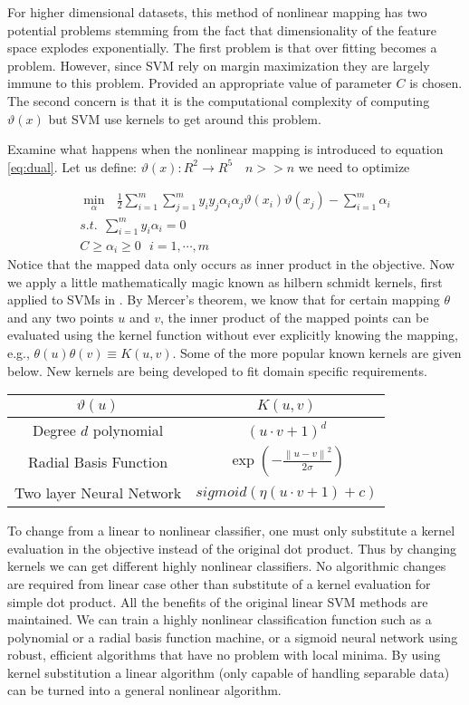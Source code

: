 For higher dimensional datasets, this method of nonlinear mapping has two potential problems stemming from the fact that dimensionality of the feature space explodes exponentially. The first problem is that over fitting becomes a problem. However, since SVM rely on margin maximization they are largely immune to this problem. Provided an appropriate value of parameter $C$ is chosen. The second concern is that it is the computational complexity of   computing $\vartheta(x)$ but SVM use kernels to get around this problem.  

Examine what happens when  the nonlinear mapping is introduced to equation \ref{eq:dual}. Let us define: $\vartheta(x):R^2\rightarrow R^5 \quad n>> n$  we need to optimize

\begin{equation}
\begin{array}{c}
\min_{\alpha} \ \ \   \frac{1}{2} \sum_{i=1}^{m}{\sum_{j=1}^{m}{y_iy_j\alpha_i\alpha_j\vartheta(x_i)\vartheta(x_j)}} - \sum_{i=1}^{m}{\alpha_i} \\
s.t. \ \ \sum_{i=1}^{m}{y_i\alpha_i}=0   \\
 C \geq \alpha_i \geq 0  \ \ \ i=1,\cdots , m 
 \end{array} 
\label{eq:dualkernel}
\end{equation}
Notice that the mapped data only occurs as inner product in the objective. Now we apply a little mathematically magic known as hilbern schmidt kernels, first applied to SVMs in \cite{svmintroduce}.  By Mercer's theorem, we know that for certain mapping $\theta$ and any two points $u$ and $v$, the inner product of the mapped points can be evaluated using the kernel function without ever explicitly knowing the mapping, e.g., $\theta(u)\theta(v)\equiv K(u,v)$. Some of the more popular known kernels are given below. New kernels are being developed to fit domain specific requirements. 
\begin{center}
	\begin{tabular}{cc}
	$\vartheta(u)$  & $K(u,v)$ \\ \hline 
	Degree $d$ polynomial & $\left(u\cdot v +1\right)^d$ \\ 
	Radial Basis Function & $\exp \left( - \frac{\left\|u-v\right\|^2}{2\sigma}\right) $ \\ 
	Two layer Neural Network& $ sigmoid \left(\eta\left(u\cdot v +1\right)+c\right)$ \\ 
	\end{tabular}
\end{center}
To change from a linear to nonlinear classifier, one must only substitute a kernel evaluation in the objective instead of the original dot product. Thus by changing kernels we can get different highly nonlinear classifiers. No algorithmic changes are required from linear case other than substitute of a kernel evaluation for simple dot product. All the benefits of the original linear SVM methods are maintained. We can train a highly nonlinear classification function such as a polynomial or a radial basis function machine, or a sigmoid neural network using robust, efficient algorithms that have no problem with local minima. By using kernel substitution a linear algorithm (only capable of handling separable data) can be turned into a general nonlinear algorithm. 
